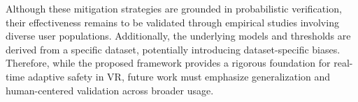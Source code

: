 \documentclass{vgtc}                          %
\begin{document}
Although these mitigation strategies are grounded in probabilistic verification, their effectiveness remains to be validated through empirical studies involving diverse user populations. Additionally, the underlying models and thresholds are derived from a specific dataset, potentially introducing dataset-specific biases. Therefore, while the proposed framework provides a rigorous foundation for real-time adaptive safety in VR, future work must emphasize generalization and human-centered validation across broader usage.





\end{document}
